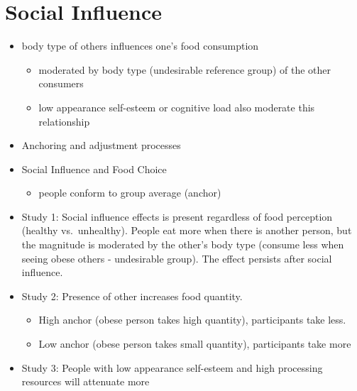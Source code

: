 \documentclass[
]{book}
\providecommand{\tightlist}{%
  \setlength{\itemsep}{0pt}\setlength{\parskip}{0pt}}
\begin{document}
\hypertarget{social-influence}{%
\section{Social Influence}\label{social-influence}}

\citep{mcferran2010}

\begin{itemize}
\item
  body type of others influences one's food consumption

  \begin{itemize}
  \item
    moderated by body type (undesirable reference group) of the other consumers
  \item
    low appearance self-esteem or cognitive load also moderate this relationship
  \end{itemize}
\item
  Anchoring and adjustment processes
\item
  Social Influence and Food Choice

  \begin{itemize}
  \tightlist
  \item
    people conform to group average (anchor)
  \end{itemize}
\item
  Study 1: Social influence effects is present regardless of food perception (healthy vs.~unhealthy). People eat more when there is another person, but the magnitude is moderated by the other's body type (consume less when seeing obese others - undesirable group). The effect persists after social influence.
\item
  Study 2: Presence of other increases food quantity.

  \begin{itemize}
  \item
    High anchor (obese person takes high quantity), participants take less.
  \item
    Low anchor (obese person takes small quantity), participants take more
  \end{itemize}
\item
  Study 3: People with low appearance self-esteem and high processing resources will attenuate more
\end{itemize}

\citep{moreau2010}
\end{document}
